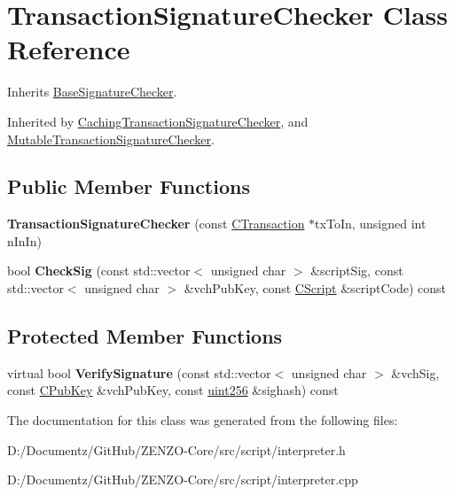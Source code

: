 \hypertarget{class_transaction_signature_checker}{}\section{Transaction\+Signature\+Checker Class Reference}
\label{class_transaction_signature_checker}


Inherits \mbox{\hyperlink{class_base_signature_checker}{Base\+Signature\+Checker}}.



Inherited by \mbox{\hyperlink{class_caching_transaction_signature_checker}{Caching\+Transaction\+Signature\+Checker}}, and \mbox{\hyperlink{class_mutable_transaction_signature_checker}{Mutable\+Transaction\+Signature\+Checker}}.

\subsection*{Public Member Functions}
\begin{DoxyCompactItemize}
\item 
\mbox{\label{class_transaction_signature_checker_ab1e6927dad48bb5ae8109acdb39eaf56}} 
{\bfseries Transaction\+Signature\+Checker} (const \mbox{\hyperlink{class_c_transaction}{C\+Transaction}} $\ast$tx\+To\+In, unsigned int n\+In\+In)
\item 
\mbox{\label{class_transaction_signature_checker_a4c1b0660671ef71492259d2a522140dc}} 
bool {\bfseries Check\+Sig} (const std\+::vector$<$ unsigned char $>$ \&script\+Sig, const std\+::vector$<$ unsigned char $>$ \&vch\+Pub\+Key, const \mbox{\hyperlink{class_c_script}{C\+Script}} \&script\+Code) const
\end{DoxyCompactItemize}
\subsection*{Protected Member Functions}
\begin{DoxyCompactItemize}
\item 
\mbox{\label{class_transaction_signature_checker_a8691f10179573b1421defe3843c04c96}} 
virtual bool {\bfseries Verify\+Signature} (const std\+::vector$<$ unsigned char $>$ \&vch\+Sig, const \mbox{\hyperlink{class_c_pub_key}{C\+Pub\+Key}} \&vch\+Pub\+Key, const \mbox{\hyperlink{classuint256}{uint256}} \&sighash) const
\end{DoxyCompactItemize}


The documentation for this class was generated from the following files\+:\begin{DoxyCompactItemize}
\item 
D\+:/\+Documentz/\+Git\+Hub/\+Z\+E\+N\+Z\+O-\/\+Core/src/script/interpreter.\+h\item 
D\+:/\+Documentz/\+Git\+Hub/\+Z\+E\+N\+Z\+O-\/\+Core/src/script/interpreter.\+cpp\end{DoxyCompactItemize}
